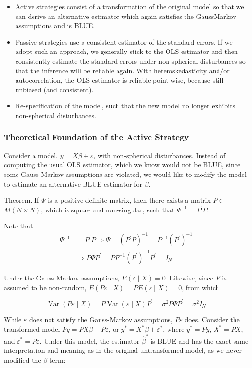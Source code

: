 \begin{itemize}
  \item Active strategies consist of a transformation of the original model so that we can derive an alternative estimator which again satisfies the GaussMarkov assumptions and is BLUE.
  \item Passive strategies use a consistent estimator of the standard errors. If we adopt such an approach, we generally stick to the OLS estimator and then consistently estimate the standard errors under non-spherical disturbances so that the inference will be reliable again. With heteroskedasticity and/or autocorrelation, the OLS estimator is reliable point-wise, because still unbiased (and consistent).
  \item Re-specification of the model, such that the new model no longer exhibits non-spherical disturbances.
\end{itemize}

\subsubsection{Theoretical Foundation of the Active Strategy}
Consider a model, $y=X \beta+\varepsilon$, with non-spherical disturbances. Instead of computing the usual OLS estimator, which we know would not be BLUE, since some Gauss-Markov assumptions are violated, we would like to modify the model to estimate an alternative BLUE estimator for $\beta$.

Theorem. If $\Psi$ is a positive definite matrix, then there exists a matrix $P \in$ $M(N \times N)$, which is square and non-singular, such that $\Psi^{-1}=P^{\prime} P$.

Note that
$$\begin{aligned}
    \Psi^{-1} & =P^{\prime} P \Longrightarrow \Psi=\left(P^{\prime} P\right)^{-1}=P^{-1}\left(P^{\prime}\right)^{-1} \\
    & \Longrightarrow P \Psi P^{\prime}=P P^{-1}\left(P^{\prime}\right)^{-1} P^{\prime}=I_{N}
  \end{aligned}$$

Under the Gauss-Markov assumptions, $E(\varepsilon \mid X)=0$. Likewise, since $P$ is assumed to be non-random, $E(P \varepsilon \mid X)=P E(\varepsilon \mid X)=0$, from which

$$
\operatorname{Var}(P \varepsilon \mid X)=P \operatorname{Var}(\varepsilon \mid X) P^{\prime}=\sigma^{2} P \Psi P^{\prime}=\sigma^{2} I_{N}
$$

While $\varepsilon$ does not satisfy the Gauss-Markov assumptions, $P \varepsilon$ does. Consider the transformed model $P y=P X \beta+P \varepsilon$, or $y^{*}=X^{*} \beta+\varepsilon^{*}$, where $y^{*}=P y$, $X^{*}=P X$, and $\varepsilon^{*}=P \varepsilon$. Under this model, the estimator $\widehat{\beta}^{*}$ is BLUE and has the exact same interpretation and meaning as in the original untransformed model, as we never modified the $\beta$ term:

